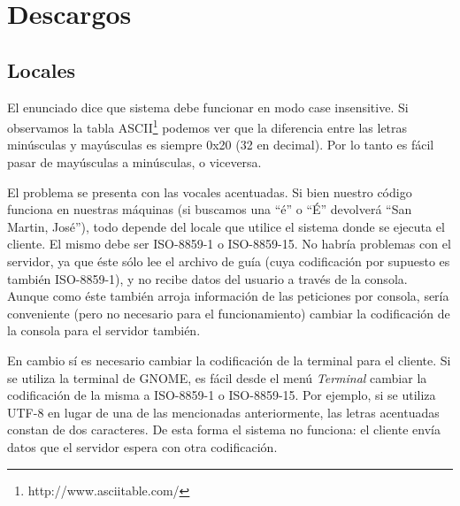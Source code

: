 \section{Descargos\label{sec:descargos}}

\subsection{Locales}
El enunciado dice que sistema debe funcionar en modo case insensitive. Si
observamos la tabla ASCII\footnote{http://www.asciitable.com/} podemos ver que
la diferencia entre las letras minúsculas y mayúsculas es siempre 0x20 (32 en
decimal). Por lo tanto es fácil pasar de mayúsculas a minúsculas, o viceversa.

El problema se presenta con las vocales acentuadas. Si bien nuestro código
funciona en nuestras máquinas (si buscamos una ``é'' o ``É'' devolverá ``San
Martin, José''), todo depende del locale que utilice el sistema donde se
ejecuta el cliente. El mismo debe ser ISO-8859-1 o ISO-8859-15. No habría
problemas con el servidor, ya que éste sólo lee el archivo de guía (cuya
codificación por supuesto es también ISO-8859-1), y no recibe datos del usuario
a través de la consola. Aunque como éste también arroja información de las
peticiones por consola, sería conveniente (pero no necesario para el
funcionamiento) cambiar la codificación de la consola para el servidor también.

En cambio sí es necesario cambiar la codificación de la terminal para el
cliente.  Si se utiliza la terminal de GNOME, es fácil desde el menú
\emph{Terminal} cambiar la codificación de la misma a ISO-8859-1 o ISO-8859-15.
Por ejemplo, si se utiliza UTF-8 en lugar de una de las mencionadas
anteriormente, las letras acentuadas constan de dos caracteres. De esta forma
el sistema no funciona: el cliente envía datos que el servidor espera con otra
codificación.

